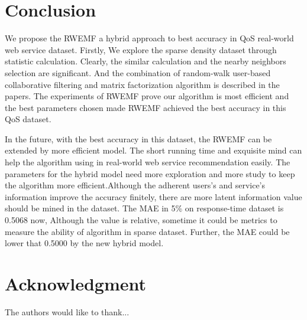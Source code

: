 \documentclass[conference]{IEEEtran}
\begin{document}
\section{Conclusion}\label{S-CN}
\par We propose the RWEMF a hybrid approach to best accuracy in QoS real-world web service dataset. Firstly, We explore the sparse density dataset through statistic calculation. Clearly, the similar calculation and the nearby neighbors selection are significant. And the combination of random-walk user-based collaborative filtering and matrix factorization algorithm is described in the papers. The experiments of RWEMF prove our algorithm is most efficient and the best parameters chosen made RWEMF achieved the best accuracy in this QoS dataset.
\par In the future, with the best accuracy in this dataset, the RWEMF can be extended by more efficient model. The short running time and exquisite mind can help the algorithm using in real-world web service recommendation easily. The parameters for the hybrid model need more exploration and more study to keep the algorithm more efficient.Although the adherent users's and service's information improve the accuracy finitely, there are more latent information\cite{liu_incorporating_2015}  value should be mined in the dataset. The MAE in 5\% on response-time dataset is 0.5068 now, Although the value is relative, sometime it could be metrics to measure the ability of algorithm in sparse dataset. Further, the MAE could be lower that 0.5000 by the new hybrid model.

\section*{Acknowledgment}
The authors would like to thank...




% 

\end{document}

